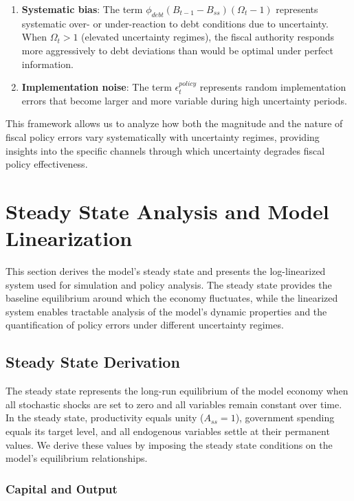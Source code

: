 \documentclass[5p,authoryear]{elsarticle}
\begin{document}
\begin{enumerate}
\item \textbf{Systematic bias}: The term $\phi_{debt} (B_{t-1} - B_{ss}) (\Omega_t - 1)$ represents systematic over- or under-reaction to debt conditions due to uncertainty. When $\Omega_t > 1$ (elevated uncertainty regimes), the fiscal authority responds more aggressively to debt deviations than would be optimal under perfect information.

\item \textbf{Implementation noise}: The term $\epsilon_t^{policy}$ represents random implementation errors that become larger and more variable during high uncertainty periods.
\end{enumerate}

This framework allows us to analyze how both the magnitude and the nature of fiscal policy errors vary systematically with uncertainty regimes, providing insights into the specific channels through which uncertainty degrades fiscal policy effectiveness.

\section{Steady State Analysis and Model Linearization}

This section derives the model's steady state and presents the log-linearized system used for simulation and policy analysis. The steady state provides the baseline equilibrium around which the economy fluctuates, while the linearized system enables tractable analysis of the model's dynamic properties and the quantification of policy errors under different uncertainty regimes.

\subsection{Steady State Derivation}

The steady state represents the long-run equilibrium of the model economy when all stochastic shocks are set to zero and all variables remain constant over time. In the steady state, productivity equals unity ($A_{ss} = 1$), government spending equals its target level, and all endogenous variables settle at their permanent values. We derive these values by imposing the steady state conditions on the model's equilibrium relationships.

\subsubsection{Capital and Output}
\end{document}
